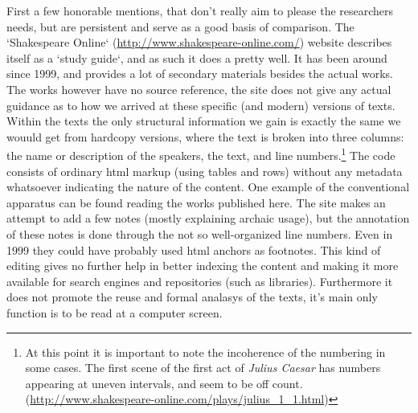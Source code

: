 First a few honorable mentions, that don't really aim to please the researchers needs, but are persistent and serve as a good basis of comparison. The `Shakespeare Online` (\url{http://www.shakespeare-online.com/}) website describes itself as a `study guide`, and as such it does a pretty well. It has been around since 1999, and provides a lot of secondary materials besides the actual works. The works however have no source reference, the site does not give any actual guidance as to how we arrived at these specific (and modern) versions of texts. Within the texts the only structural information we gain is exactly the same we wouuld get from hardcopy versions, where the text is broken into three columns: the name or description of the speakers, the text, and line numbers.\footnote{At this point it is important to note the incoherence of the numbering in some cases. The first scene of the first act of \textit{Julius Caesar} has numbers appearing at uneven intervals, and seem to be off count. (\url{http://www.shakespeare-online.com/plays/julius_1_1.html})} The code consists of ordinary html markup (using tables and rows) without any metadata whatsoever indicating the nature of the content. One example of the conventional apparatus can be found reading the works published here. The site makes an attempt to add a few notes (mostly explaining archaic usage), but the annotation of these notes is done through the not so well-organized line numbers. Even in 1999 they could have probably used html anchors as footnotes.
This kind of editing gives no further help in better indexing the content and making it more available for search engines and repositories (such as libraries). Furthermore it does not promote the reuse and formal analasys of the texts, it's main only function is to be read at a computer screen. 
